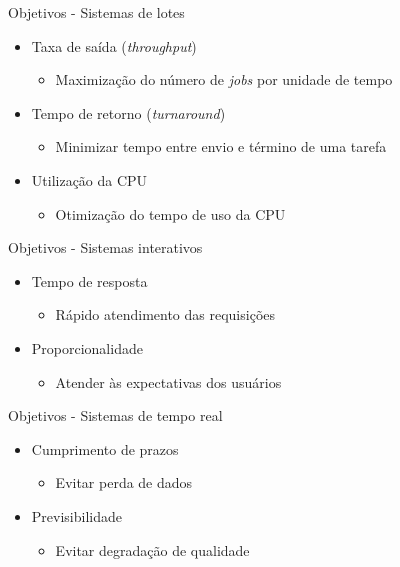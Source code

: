 \documentclass[aspectratio=169,
				xcolor=table]{beamer}
\begin{document}
	\begin{frame}{Objetivos - Sistemas de lotes}
		\begin{itemize}
			\item Taxa de saída (\textit{throughput})
			\begin{itemize}
				\item Maximização do número de \textit{jobs} por unidade de tempo
			\end{itemize}
			\vspace{1em}
			\item Tempo de retorno (\textit{turnaround})
			\begin{itemize}
				\item Minimizar tempo entre envio e término de uma tarefa
			\end{itemize}
			\vspace{1em}
			\item Utilização da CPU
			\begin{itemize}
				\item Otimização do tempo de uso da CPU
			\end{itemize}
		\end{itemize}
	\end{frame}
		
	\begin{frame}{Objetivos - Sistemas interativos}
		\begin{itemize}
			\item Tempo de resposta
			\begin{itemize}
				\item Rápido atendimento das requisições
			\end{itemize}
			\vspace{1em}
			\item Proporcionalidade
			\begin{itemize}
				\item Atender às expectativas dos usuários
			\end{itemize}
		\end{itemize}
	\end{frame}
		
	\begin{frame}{Objetivos - Sistemas de tempo real}
		\begin{itemize}
			\item Cumprimento de prazos
			\begin{itemize}
				\item Evitar perda de dados
			\end{itemize}
			\vspace{1em}
			\item Previsibilidade
			\begin{itemize}
				\item Evitar degradação de qualidade
			\end{itemize}
		\end{itemize}
	\end{frame}
	
\end{document}

